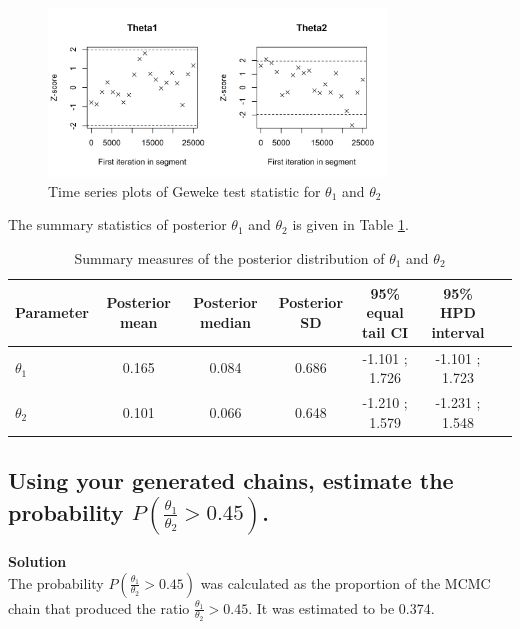 \documentclass[12pt]{article}
\begin{document}
\begin{figure}[H]
    \centering    \includegraphics[width=0.8\textwidth]{pictures/fig05-mh-geweke.png}
    \caption{Time series plots of Geweke test statistic for \( \theta_1 \) and \( \theta_2 \)}
    \label{fig:mh-geweke}
\end{figure}

The summary statistics of posterior $\theta_1$ and $\theta_2$ is given in Table \ref{tbl:mh-summary}.

\begin{table}[H]
\centering
\begin{tabular}{lcccccc}
\hline
Parameter & Posterior mean & Posterior median & Posterior SD & 95\% equal tail CI & 95\% HPD interval \\
\hline
$\theta_1$ & 0.165 & 0.084 & 0.686 & -1.101 ; 1.726 & -1.101 ; 1.723 \\
$\theta_2$ & 0.101 & 0.066 & 0.648 & -1.210 ; 1.579 & -1.231 ; 1.548 \\
\hline
\end{tabular}
\caption{Summary measures of the posterior distribution of $\theta_1$ and $\theta_2$}
\label{tbl:mh-summary}
\end{table}

\subsection{Using your generated chains, estimate the probability \( P\left(\frac{\theta_1}{\theta_2} > 0.45\right) \).}
\textbf{Solution}\\
The probability \( P\left(\frac{\theta_1}{\theta_2} > 0.45\right) \) was calculated as the proportion of the MCMC chain that produced the ratio \( \frac{\theta_1}{\theta_2} > 0.45 \). It was estimated to be 0.374.

\printbibliography
\end{document}
